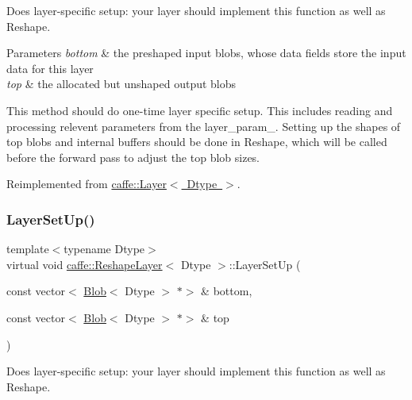 Does layer-\/specific setup\+: your layer should implement this function as well as Reshape. 


\begin{DoxyParams}{Parameters}
{\em bottom} & the preshaped input blobs, whose data fields store the input data for this layer \\
\hline
{\em top} & the allocated but unshaped output blobs\\
\hline
\end{DoxyParams}
This method should do one-\/time layer specific setup. This includes reading and processing relevent parameters from the {\ttfamily layer\+\_\+param\+\_\+}. Setting up the shapes of top blobs and internal buffers should be done in {\ttfamily Reshape}, which will be called before the forward pass to adjust the top blob sizes. 

Reimplemented from \mbox{\hyperlink{classcaffe_1_1_layer_a481323a3e0972c682787f2137468c29f}{caffe\+::\+Layer$<$ Dtype $>$}}.

\mbox{\label{classcaffe_1_1_reshape_layer_a5d832d4057a304791ecadd242f2c5a6e}} 
\subsubsection{\texorpdfstring{Layer\+Set\+Up()}{LayerSetUp()}\hspace{0.1cm}{\footnotesize\ttfamily [2/2]}}
{\footnotesize\ttfamily template$<$typename Dtype$>$ \\
virtual void \mbox{\hyperlink{classcaffe_1_1_reshape_layer}{caffe\+::\+Reshape\+Layer}}$<$ Dtype $>$\+::Layer\+Set\+Up (\begin{DoxyParamCaption}\item[{const vector$<$ \mbox{\hyperlink{classcaffe_1_1_blob}{Blob}}$<$ Dtype $>$ $\ast$$>$ \&}]{bottom,  }\item[{const vector$<$ \mbox{\hyperlink{classcaffe_1_1_blob}{Blob}}$<$ Dtype $>$ $\ast$$>$ \&}]{top }\end{DoxyParamCaption})\hspace{0.3cm}{\ttfamily [virtual]}}



Does layer-\/specific setup\+: your layer should implement this function as well as Reshape. 


